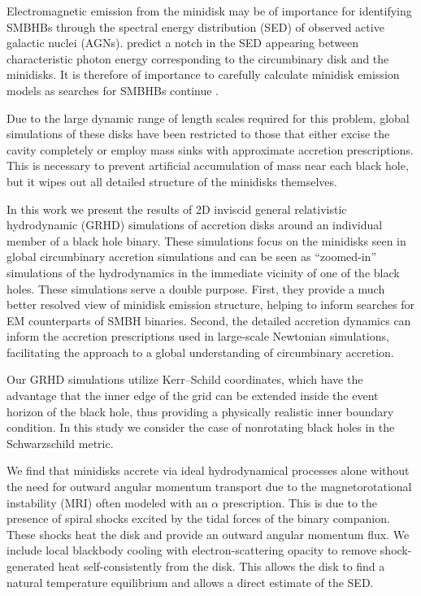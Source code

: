 \documentclass{emulateapj}
\begin{document}
Electromagnetic emission from the minidisk may be of importance for identifying SMBHBs through the spectral energy distribution (SED) of observed active galactic nuclei (AGNs). \cite{Roedig14} predict a notch in the SED appearing between characteristic photon energy corresponding to the circumbinary disk and the minidisks. It is therefore of importance to carefully calculate minidisk emission models as searches for SMBHBs continue \citep{Runnoe15,Li16,Charisi16}.

Due to the large dynamic range of length scales required for this problem, global simulations of these disks have been restricted to those that either excise the cavity completely or employ mass sinks with approximate accretion prescriptions.  This is necessary to prevent artificial accumulation of mass near each black hole, but it wipes out all detailed structure of the minidisks themselves.

In this work we present the results of 2D inviscid general relativistic hydrodynamic (GRHD) simulations of accretion disks around an individual member of a black hole binary. These simulations focus on the minidisks seen in global circumbinary accretion simulations and can be seen as ``zoomed-in'' simulations of the hydrodynamics in the immediate vicinity of one of the black holes.  These simulations serve a double purpose. First, they provide a much better resolved view of minidisk emission structure, helping to inform searches for EM counterparts of SMBH binaries.  Second, the detailed accretion dynamics can inform the accretion prescriptions used in large-scale Newtonian simulations, facilitating the approach to a global understanding of circumbinary accretion.

Our GRHD simulations utilize Kerr--Schild coordinates, which have the advantage that the inner edge of the grid can be extended inside the event horizon of the black hole, thus providing a physically realistic inner boundary condition. In this study we consider the case of nonrotating black holes in the Schwarzschild metric.

  We find that minidisks accrete via ideal hydrodynamical processes alone without the need for outward angular momentum transport due to the magnetorotational instability (MRI) often modeled with an $\alpha$ prescription.
This is due to the presence of spiral shocks excited by the tidal forces of the binary companion. These shocks heat the disk and provide an outward angular momentum flux. We include local 
blackbody cooling with electron-scattering opacity to remove shock-generated
heat self-consistently from the disk.  This allows the disk to find a natural
temperature equilibrium and allows a direct estimate of the SED.
\end{document}
